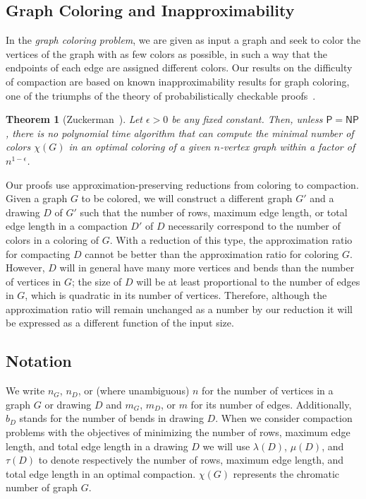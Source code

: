 \documentclass[12pt]{article}
\newtheorem{theorem}{Theorem}
\theoremstyle{definitions}
\renewcommand{\P}{\mathsf{P}}
\newcommand{\NP}{\mathsf{NP}}
\begin{document}
\subsection{Graph Coloring and Inapproximability}

In the \emph{graph coloring problem}, we are given as input a graph and seek to color the vertices of the graph with as few colors as possible, in such a way that the endpoints of each edge are assigned different colors. Our results on the difficulty of compaction are based on known inapproximability results for graph coloring, one of the triumphs of the theory of probabilistically checkable proofs~\cite{Zuckerman:2007, Feige-Color, Khot-Color}.

\begin{theorem}[Zuckerman~\cite{Zuckerman:2007}]
\label{lem:chi-rho}
Let $\epsilon>0$ be any fixed constant. Then, unless $\P=\NP$, there is no
polynomial time algorithm that can compute the minimal number of colors
$\chi(G)$ in an optimal coloring of a given $n$-vertex graph within a factor of $n^{1-\epsilon}$.
\end{theorem}

Our proofs use approximation-preserving reductions from coloring to compaction.
Given a graph $G$ to be colored, we will construct a different graph $G'$ and a
drawing $D$ of $G'$ such that the number of rows, maximum edge length, or total
edge length in a compaction $D'$ of $D$ necessarily correspond to the number of
colors in a coloring of $G$. With a reduction of this type, the approximation
ratio for compacting $D$ cannot be better than the approximation ratio for
coloring $G$. However, $D$ will in general have many more vertices and bends
than the number of vertices in $G$; the size of $D$ will be at least proportional to the number of edges in $G$, which is quadratic in its number of vertices. Therefore, although the approximation ratio will remain unchanged as a number by our reduction it will be expressed as a different function of the input size.

\subsection{Notation}
We write $n_G$, $n_D$, or (where unambiguous) $n$ for the number of vertices in
a graph $G$ or drawing $D$ and $m_G$, $m_D$, or $m$ for its number of edges.
Additionally, $b_D$ stands for the number of bends in drawing $D$. When we consider
compaction problems with the objectives of minimizing the number of rows, maximum edge length, and
total edge length in a drawing $D$ we will use $\lambda(D)$, $\mu(D)$, and $\tau(D)$ to denote
respectively the number of rows, maximum edge length, and total edge length 
in an optimal compaction. $\chi(G)$ represents the chromatic number of graph $G$.
\end{document}
